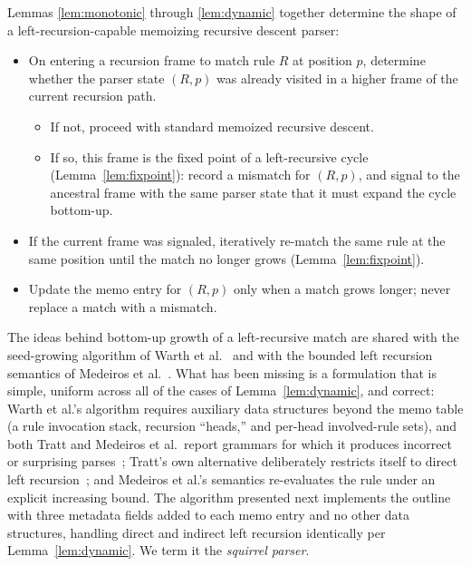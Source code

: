 \documentclass[manuscript]{acmart}
\begin{document}
Lemmas \ref{lem:monotonic} through \ref{lem:dynamic} together determine the shape of a left-recursion-capable memoizing recursive descent parser:

\begin{itemize}
    \item On entering a recursion frame to match rule $R$ at position $p$, determine whether the parser state $(R, p)$ was already visited in a higher frame of the current recursion path.
    \begin{itemize}
        \item If not, proceed with standard memoized recursive descent.
        \item If so, this frame is the fixed point of a left-recursive cycle (Lemma~\ref{lem:fixpoint}): record a mismatch for $(R, p)$, and signal to the ancestral frame with the same parser state that it must expand the cycle bottom-up.
    \end{itemize}
    \item If the current frame was signaled, iteratively re-match the same rule at the same position until the match no longer grows (Lemma~\ref{lem:fixpoint}).
    \item Update the memo entry for $(R, p)$ only when a match grows longer; never replace a match with a mismatch.
\end{itemize}

The ideas behind bottom-up growth of a left-recursive match are shared with the seed-growing algorithm of Warth et al.~\cite{warth2008} and with the bounded left recursion semantics of Medeiros et al.~\cite{medeiros2014}. What has been missing is a formulation that is simple, uniform across all of the cases of Lemma~\ref{lem:dynamic}, and correct: Warth et al.'s algorithm requires auxiliary data structures beyond the memo table (a rule invocation stack, recursion ``heads,'' and per-head involved-rule sets), and both Tratt and Medeiros et al.\ report grammars for which it produces incorrect or surprising parses~\cite{tratt2010,medeiros2014}; Tratt's own alternative deliberately restricts itself to direct left recursion~\cite{tratt2010}; and Medeiros et al.'s semantics re-evaluates the rule under an explicit increasing bound. The algorithm presented next implements the outline with three metadata fields added to each memo entry and no other data structures, handling direct and indirect left recursion identically per Lemma~\ref{lem:dynamic}. We term it the \emph{squirrel parser}.

\end{document}
